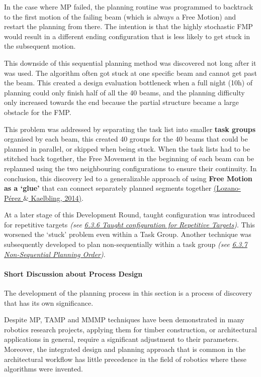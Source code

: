 \documentclass[11pt]{book}
\begin{document}
In the case where MP failed, the planning routine was programmed to backtrack to the first motion of the failing beam (which is always a Free Motion) and restart the planning from there. The intention is that the highly stochastic FMP would result in a different ending configuration that is less likely to get stuck in the subsequent motion.

This downside of this sequential planning method was discovered not long after it was used. The algorithm often got stuck at one specific beam and cannot get past the beam. This created a design evaluation bottleneck when a full night (10h) of planning could only finish half of all the 40 beams, and the planning difficulty only increased towards the end because the partial structure became a large obstacle for the FMP.

This problem was addressed by separating the task list into smaller \textbf{task groups }organised by each beam, this created 40 groups for the 40 beams that could be planned in parallel, or skipped when being stuck. When the task lists had to be stitched back together, the Free Movement in the beginning of each beam can be replanned using the two neighbouring configurations to ensure their continuity. In conclusion, this discovery led to a generalizable approach of using \textbf{Free Motion as a ‘glue’} that can connect separately planned segments together \href{https://www.zotero.org/google-docs/?PykTOl}{(Lozano-Pérez $\&$ Kaelbling, 2014)}.

At a later stage of this Development Round, taught configuration was introduced for repetitive targets\textit{\textcolor[HTML]{B7B7B7}{ (see \uline{6.3.6 Taught configuration for Repetitive Targets})}}. This worsened the ‘stuck’ problem even within a Task Group. Another technique was subsequently developed to plan non-sequentially within a task group \textit{\textcolor[HTML]{B7B7B7}{(see \uline{6.3.7 Non-Sequential Planning Order})}}.

\paragraph{Short Discussion about Process Design}

The development of the planning process in this section is a process of discovery that has its own significance. 

Despite MP, TAMP and MMMP techniques have been demonstrated in many robotics research projects, applying them for timber construction, or architectural applications in general, require a significant adjustment to their parameters. Moreover, the integrated design and planning approach that is common in the architectural workflow has little precedence in the field of robotics where these algorithms were invented.
\end{document}
